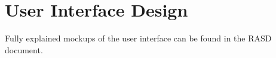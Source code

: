 \section{User Interface Design}
Fully explained mockups of the user interface can be found in the RASD document.